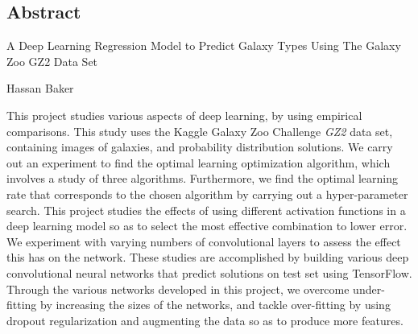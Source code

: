 \documentclass[12pt,a4paper,oneside,oldfontcommands]{memoir}
\begin{document}
\begin{Abstract}
\thispagestyle{plain}

\chapter*{Abstract}

\Large
 \begin{center}
A Deep Learning Regression Model to Predict Galaxy Types Using The Galaxy Zoo GZ2 Data Set\\ 

\hspace{10pt}

\large
Hassan Baker

\hspace{10pt}

\small  

\end{center}

\hspace{10pt}

\normalsize
\noindent

This project studies various aspects of deep learning, by using empirical comparisons. This study uses the Kaggle Galaxy Zoo Challenge \textit{GZ2} data set, containing images of galaxies, and probability distribution solutions. We carry out an experiment to find the optimal learning optimization algorithm, which involves a study of three algorithms. Furthermore, we find the optimal learning rate that corresponds to the chosen algorithm by carrying out a hyper-parameter search. This project studies the effects of using different activation functions in a deep learning model so as to select the most effective combination to lower error. We experiment with varying numbers of convolutional layers to assess the effect this has on the network. These studies are accomplished by building various deep convolutional neural networks that predict solutions on test set using TensorFlow. Through the various networks developed in this project, we overcome under-fitting by increasing the sizes of the networks, and tackle over-fitting by using dropout regularization and augmenting the data so as to produce more features. 

\end{Abstract}


\clearpage
\end{document}
